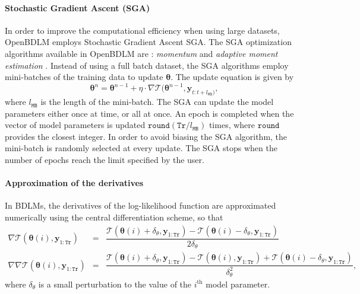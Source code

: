 \paragraph{Stochastic Gradient Ascent (SGA)}  In order to improve the computational efficiency when using large datasets, OpenBDLM employs Stochastic Gradient Ascent SGA. The SGA optimization algorithms available in OpenBDLM are : \emph{momentum} and  \emph{adaptive moment estimation} \cite{Goodfellow-et-al-2016}. Instead of using a full batch dataset, the SGA algorithms employ mini-batches of the training data to update $\bm\theta$. The update equation is given by
\begin{equation}
\bm\theta^{n} = \bm\theta^{n-1} + \eta\cdot \nabla\mathcal{T}(\bm\theta^{n-1}, \mathbf{y}_{t:t+l_{\mathtt{MB}})},
\end{equation}
where $l_{\mathtt{MB}}$ is the length of the mini-batch. The SGA can update the model parameters either once at time, or all at once.  An epoch  is completed when the vector of  model parameters is updated $\mathtt{round}(\mathtt{Tr}/ l_{\mathtt{MB}})$ times, where $\mathtt{round}$ provides the closest integer. In order to avoid biasing the SGA algorithm, the mini-batch is randomly selected at every update. The SGA stops when the number of epochs reach the limit specified by the user.

\paragraph{Approximation of the derivatives}

In BDLMs, the derivatives of the log-likelihood function are  approximated numerically using the central differentiation scheme, so that
\begin{equation}
\begin{array}{lcl}
 \nabla \mathcal{T}(\bm\theta(i),\mathbf{y}_{1:\mathtt{Tr}}) & = &\dfrac{\mathcal{T}(\bm\theta(i) + \delta_{\theta}, \mathbf{y}_{1:\mathtt{Tr}}) - \mathcal{T}(\bm\theta(i) - \delta_{\theta}, \mathbf{y}_{1:\mathtt{Tr}})}{2\delta_{\theta}}\\[12pt]
 
 \nabla \nabla \mathcal{T}(\bm\theta(i),\mathbf{y}_{1:\mathtt{Tr}}) & = & \dfrac{\mathcal{T}(\bm\theta(i) + \delta_{\theta}, \mathbf{y}_{1:\mathtt{Tr}}) - \mathcal{T}(\bm\theta(i), \mathbf{y}_{1:\mathtt{Tr}}) + \mathcal{T}(\bm\theta(i) - \delta_{\theta}, \mathbf{y}_{1:\mathtt{Tr}})}{\delta_{\theta}^{2}},
\label{EQ:numericaldiff}
\end{array}
\end{equation}
where $\delta_{\theta}$ is a small perturbation to the value of the $i^{\text{th}}$ model parameter.
